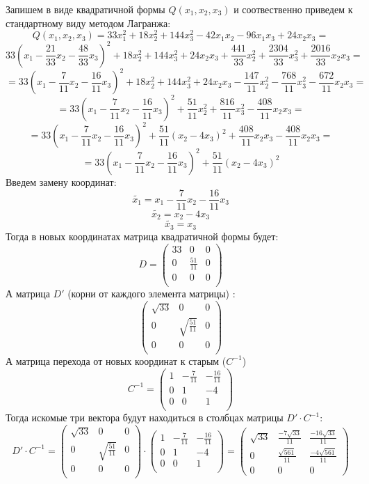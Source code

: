 \documentclass[a4paper,12pt]{article}
\begin{document}
Запишем в виде квадратичной формы $Q(x_1, x_2, x_3)$ и соотвественно приведем к стандартному виду методом Лагранжа:
\[
Q(x_1, x_2, x_3) = 33x_1^2 + 18x_2^2 + 144x_3^2 - 42x_1x_2 -96x_1x_3 + 24x_2x_3 =
\]
\[
33(x_1 - \frac{21}{33}x_2 - \frac{48}{33}x_3)^2 + 18x_2^2 + 144x_3^2 +24x_2x_3 + \frac{441}{33}x_2^2 + \frac{2304}{33} x_3^2 + \frac{2016}{33} x_2x_3 = 
\]
\[
= 33\left(x_1 - \frac{7}{11}x_2 - \frac{16}{11}x_3\right)^2 + 18x_2^2 + 144x_3^2 + 24x_2x_3 - \frac{147}{11}x_2^2 - \frac{768}{11}x_3^2 - \frac{672}{11}x_2x_3 =
\]
\[
= 33\left(x_1 - \frac{7}{11}x_2 - \frac{16}{11}x_3\right)^2 + \frac{51}{11}x_2^2 + \frac{816}{11}x_3^2 - \frac{408}{11}x_2x_3 = 
\]
\[
=
33\left(x_1 - \frac{7}{11}x_2 - \frac{16}{11}x_3\right)^2 + \frac{51}{11}(x_2 - 4x_3)^2 + \frac{408}{11}x_2x_3 - \frac{408}{11}x_2x_3 = 
\]
\[
=
33\left(x_1 - \frac{7}{11}x_2 - \frac{16}{11}x_3\right)^2 + \frac{51}{11}(x_2 - 4x_3)^2 
\]
Введем замену координат:
\[
\widetilde{x_1} = x_1 - \frac{7}{11}x_2- \frac{16}{11}x_3
\]
\[
\widetilde{x_2} = x_2 - 4x_3
\]
\[
\widetilde{x_3} = x_3
\]
Тогда в новых координатах матрица квадратичной формы будет:
\[
D = 
\begin{pmatrix}
33 & 0 & 0 \\
0 & \frac{51}{11} & 0 \\
0 & 0 & 0 \\
\end{pmatrix}
\]
А матрица $D'$ (корни от каждого элемента матрицы) :
\[
\begin{pmatrix}
\sqrt{33}& 0 & 0 \\
0 & \sqrt{\frac{51}{11}}& 0 \\
0 & 0 & 0 \\
\end{pmatrix}
\]
А матрица перехода от новых координат к старым ($C^{-1}$)
\[
C^{-1} = 
\begin{pmatrix}
1 & -\frac{7}{11} &  -\frac{16}{11} \\
0 & 1 & -4 \\
0 & 0 & 1 \\
\end{pmatrix}
\]
Тогда искомые три вектора будут находиться в столбцах матрицы $D' \cdot C^{-1}$:
\[
D' \cdot C^{-1} = 
\begin{pmatrix}
\sqrt{33}& 0 & 0 \\
0 & \sqrt{\frac{51}{11}}& 0 \\
0 & 0 & 0 \\
\end{pmatrix}
\cdot
\begin{pmatrix}
1 & -\frac{7}{11} &  -\frac{16}{11} \\
0 & 1 & -4 \\
0 & 0 & 1 \\
\end{pmatrix}
=
\left(\begin{matrix}
\sqrt{33} & \frac{-7\sqrt{33}}{11} & \frac{-16\sqrt{33}}{11} \\
0 & \frac{\sqrt{561}}{11} & \frac{-4\sqrt{561}}{11} \\
0 & 0 & 0
\end{matrix}\right)
\]
\end{document}
